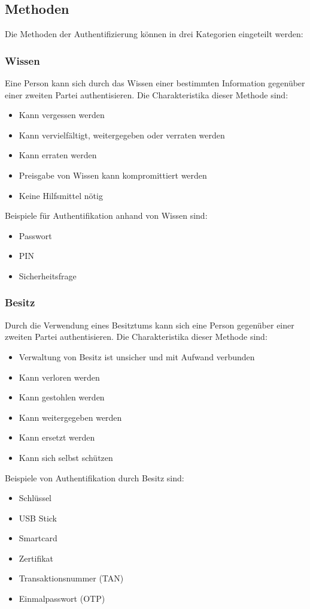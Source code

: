 \documentclass[11pt,a4paper,ngerman]{report}
\begin{document}
\subsection{Methoden}
Die Methoden der Authentifizierung können in drei Kategorien eingeteilt werden:
\subsubsection{Wissen}
Eine Person kann sich durch das Wissen einer bestimmten Information gegenüber einer zweiten Partei authentisieren. Die Charakteristika dieser Methode sind:
\begin{itemize}
    \item Kann vergessen werden
    \item Kann vervielfältigt, weitergegeben oder verraten werden
    \item Kann erraten werden
    \item Preisgabe von Wissen kann kompromittiert werden
    \item Keine Hilfsmittel nötig
\end{itemize}
Beispiele für Authentifikation anhand von Wissen sind:
\begin{itemize}
    \item Passwort
    \item PIN
    \item Sicherheitsfrage
\end{itemize}
\subsubsection{Besitz}
Durch die Verwendung eines Besitztums kann sich eine Person gegenüber einer zweiten Partei authentisieren. Die Charakteristika dieser Methode sind:
\begin{itemize}
    \item Verwaltung von Besitz ist unsicher und mit Aufwand verbunden
    \item Kann verloren werden
    \item Kann gestohlen werden
    \item Kann weitergegeben werden
    \item Kann ersetzt werden
    \item Kann sich selbst schützen
\end{itemize}
Beispiele von Authentifikation durch Besitz sind:
\begin{itemize}
    \item Schlüssel
    \item USB Stick
    \item Smartcard
    \item Zertifikat
    \item Transaktionsnummer (TAN)
    \item Einmalpasswort (OTP)
\end{itemize}
\end{document}

